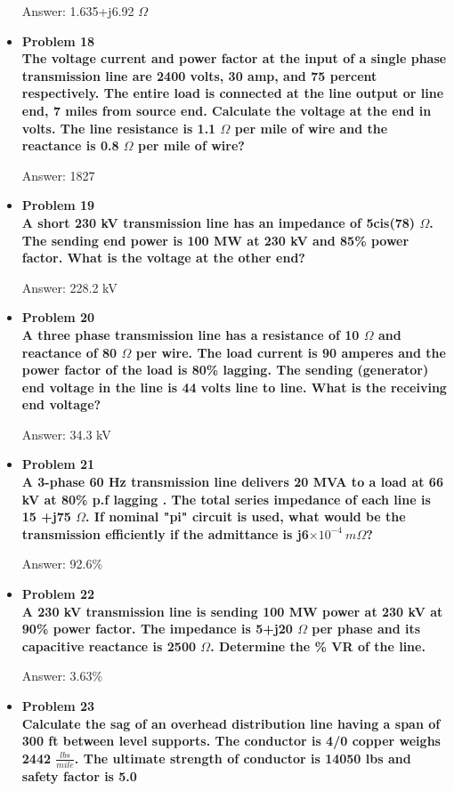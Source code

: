 \documentclass{article}
\begin{document}
\begin{center}
\begin{itemize}
    Answer: 1.635+j6.92 $\Omega$

    \item \textbf{Problem 18}\\
    \textbf{The voltage current and power factor at the input of a single phase transmission line are 2400 volts, 30 amp, and 75 percent respectively. The entire load is connected at the line output or line end, 7 miles from source end. Calculate the voltage at the end in volts. The line resistance is 1.1 $\Omega$ per mile of wire and the reactance is 0.8 $\Omega$ per mile of wire?}

    Answer: 1827

    \item \textbf{Problem 19}\\
    \textbf{A short 230 kV transmission line has an impedance of 5cis(78) $\Omega$. The sending end power is 100 MW at 230 kV and 85\% power factor. What is the voltage at the other end?}

    Answer: 228.2 kV

    \item\textbf{Problem 20}\\
    \textbf{A three phase transmission line has a resistance of 10 $\Omega$ and reactance of 80 $\Omega$ per wire. The load current is 90 amperes and the power factor of the load is 80\% lagging. The sending (generator) end voltage in the line is 44 volts line to line. What is the receiving end voltage?}

    Answer: 34.3 kV

    \item\textbf{Problem 21}\\
    \textbf{A 3-phase 60 Hz transmission line delivers 20 MVA to a load at 66 kV at 80\% p.f lagging . The total series impedance of each line is 15 +j75 $\Omega$. If nominal "pi" circuit is used, what would be the transmission efficiently if the admittance is j6$\times 10^{-4}\ m\Omega$?}

    Answer: 92.6\%

    \item\textbf{Problem 22\\
    A 230 kV transmission line is sending 100 MW power at 230 kV at 90\% power factor. The impedance is 5+j20 $\Omega$ per phase and its capacitive reactance is 2500 $\Omega$. Determine the \% VR of the line.}

    Answer: 3.63\%

    \item\textbf{Problem 23\\
    Calculate the sag of an overhead distribution line having a span of 300 ft between level supports. The conductor is 4/0 copper weighs 2442 $\frac{lbs}{mile}$. The ultimate strength of conductor is 14050 lbs and safety factor is 5.0}


\end{itemize}
\end{center}
\end{document}

